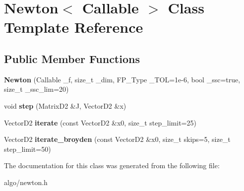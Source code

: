 \hypertarget{classNewton}{}\section{Newton$<$ Callable $>$ Class Template Reference}
\label{classNewton}
\subsection*{Public Member Functions}
\begin{DoxyCompactItemize}
\item 
\mbox{\label{classNewton_a8271deaf4a7dd62152c126fb506b8d9b}} 
{\bfseries Newton} (Callable \+\_\+f, size\+\_\+t \+\_\+dim, F\+P\+\_\+\+Type \+\_\+\+T\+OL=1e-\/6, bool \+\_\+ssc=true, size\+\_\+t \+\_\+ssc\+\_\+lim=20)
\item 
\mbox{\label{classNewton_aaf7592a3f99721b837b11f94f4f39469}} 
void {\bfseries step} (Matrix\+D2 \&J, Vector\+D2 \&x)
\item 
\mbox{\label{classNewton_a194fe411efb80bb01a215d289509d47a}} 
Vector\+D2 {\bfseries iterate} (const Vector\+D2 \&x0, size\+\_\+t step\+\_\+limit=25)
\item 
\mbox{\label{classNewton_ace30992f63ce8b2859bdb6a237040e05}} 
Vector\+D2 {\bfseries iterate\+\_\+broyden} (const Vector\+D2 \&x0, size\+\_\+t skips=5, size\+\_\+t step\+\_\+limit=50)
\end{DoxyCompactItemize}


The documentation for this class was generated from the following file\+:\begin{DoxyCompactItemize}
\item 
algo/newton.\+h\end{DoxyCompactItemize}
